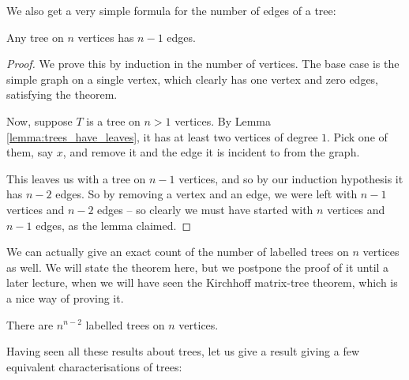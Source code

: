 \documentclass[nobib]{tufte-handout}
\begin{document}
We also get a very simple formula for the number of edges of a tree:

\begin{lemma}
  Any tree on $n$ vertices has $n-1$ edges.

  \begin{proof}
    We prove this by induction in the number of vertices. The base case is the simple graph on a single vertex, which clearly has one vertex and zero edges, satisfying the theorem.

    Now, suppose $T$ is a tree on $n > 1$ vertices. By Lemma \ref{lemma:trees_have_leaves}, it has at least two vertices of degree $1$. Pick one of them, say $x$, and remove it and the edge it is incident to from the graph. 
    
    This leaves us with a tree on $n-1$ vertices, and so by our induction hypothesis it has $n-2$ edges. So by removing a vertex and an edge, we were left with $n-1$ vertices and $n-2$ edges -- so clearly we must have started with $n$ vertices and $n-1$ edges, as the lemma claimed.
  \end{proof}
\end{lemma}

We can actually give an exact count of the number of labelled trees on $n$ vertices as well. We will state the theorem here, but we postpone the proof of it until a later lecture, when we will have seen the Kirchhoff matrix-tree theorem, which is a nice way of proving it.

\begin{theorem}
  There are $n^{n-2}$ labelled trees on $n$ vertices.
\end{theorem}

Having seen all these results about trees, let us give a result giving a few equivalent characterisations of trees:
\end{document}
